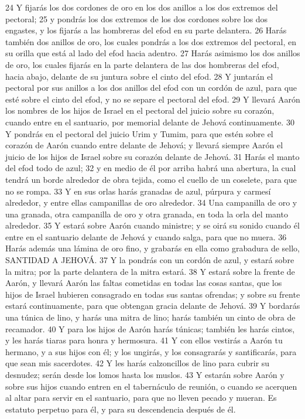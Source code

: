 24 Y fijarás los dos cordones de oro en los dos anillos a los dos extremos del pectoral;
25 y pondrás los dos extremos de los dos cordones sobre los dos engastes, y los fijarás a las hombreras del efod en su parte delantera.
26 Harás también dos anillos de oro, los cuales pondrás a los dos extremos del pectoral, en su orilla que está al lado del efod hacia adentro.
27 Harás asimismo los dos anillos de oro, los cuales fijarás en la parte delantera de las dos hombreras del efod, hacia abajo, delante de su juntura sobre el cinto del efod.
28 Y juntarán el pectoral por sus anillos a los dos anillos del efod con un cordón de azul, para que esté sobre el cinto del efod, y no se separe el pectoral del efod.
29 Y llevará Aarón los nombres de los hijos de Israel en el pectoral del juicio sobre su corazón, cuando entre en el santuario, por memorial delante de Jehová continuamente.
30 Y pondrás en el pectoral del juicio Urim y Tumim,  para que estén sobre el corazón de Aarón cuando entre delante de Jehová; y llevará siempre Aarón el juicio de los hijos de Israel sobre su corazón delante de Jehová.
31 Harás el manto del efod todo de azul;
32 y en medio de él por arriba habrá una abertura, la cual tendrá un borde alrededor de obra tejida, como el cuello de un coselete, para que no se rompa.
33 Y en sus orlas harás granadas de azul, púrpura y carmesí alrededor, y entre ellas campanillas de oro alrededor.
34 Una campanilla de oro y una granada, otra campanilla de oro y otra granada, en toda la orla del manto alrededor.
35 Y estará sobre Aarón cuando ministre; y se oirá su sonido cuando él entre en el santuario delante de Jehová y cuando salga, para que no muera.
36 Harás además una lámina de oro fino, y grabarás en ella como grabadura de sello, SANTIDAD A JEHOVÁ.
37 Y la pondrás con un cordón de azul, y estará sobre la mitra; por la parte delantera de la mitra estará.
38 Y estará sobre la frente de Aarón, y llevará Aarón las faltas cometidas en todas las cosas santas, que los hijos de Israel hubieren consagrado en todas sus santas ofrendas; y sobre su frente estará continuamente, para que obtengan gracia delante de Jehová.
39 Y bordarás una túnica de lino, y harás una mitra de lino; harás también un cinto de obra de recamador.
40 Y para los hijos de Aarón harás túnicas; también les harás cintos, y les harás tiaras para honra y hermosura.
41 Y con ellos vestirás a Aarón tu hermano, y a sus hijos con él; y los ungirás, y los consagrarás y santificarás, para que sean mis sacerdotes.
42 Y les harás calzoncillos de lino para cubrir su desnudez; serán desde los lomos hasta los muslos.
43 Y estarán sobre Aarón y sobre sus hijos cuando entren en el tabernáculo de reunión, o cuando se acerquen al altar para servir en el santuario, para que no lleven pecado y mueran. Es estatuto perpetuo para él, y para su descendencia después de él.

